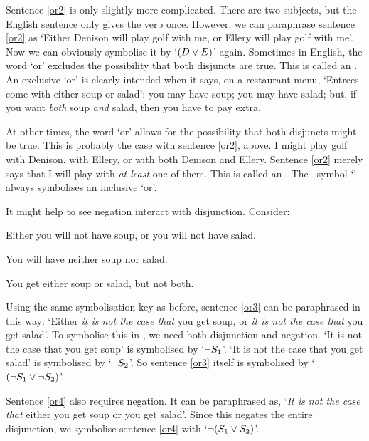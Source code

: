 Sentence \ref{or2} is only slightly more complicated. There are two subjects, but the English sentence only gives the verb once. However, we can paraphrase sentence \ref{or2} as `Either Denison will play golf with me, or Ellery will play golf with me'. Now we can obviously symbolise it by `$(D \vee E)$' again.
Sometimes in English, the word `or' excludes the possibility that both disjuncts are true. This is called an .  An exclusive `or' is clearly intended when it says, on a restaurant menu, `Entrees come with either soup or salad': you may have soup; you may have salad; but, if you want \emph{both} soup \emph{and} salad, then you have to pay extra.

At other times, the word `or' allows for the possibility that both disjuncts might be true. This is probably the case with sentence \ref{or2}, above. I might play golf with Denison, with Ellery, or with both Denison and Ellery. Sentence \ref{or2} merely says that I will play with \emph{at least} one of them. This is called an . The \TFL\ symbol `\eor' always symbolises an inclusive `or'.

It might help to see negation interact with disjunction. Consider:
	\begin{earg}
		\item[\ex{or3}] Either you will not have soup, or you will not have salad.
		\item[\ex{or4}] You will have neither soup nor salad.
		\item[\ex{or.xor}] You get either soup or salad, but not both.
	\end{earg}
Using the same symbolisation key as before, sentence \ref{or3} can be paraphrased in this way: `Either \emph{it is not the case that} you get soup, or \emph{it is not the case that} you get salad'. To symbolise this in \TFL, we need both disjunction and negation. `It is not the case that you get soup' is symbolised by `$\neg S_1$'. `It is not the case that you get salad' is symbolised by `$\neg S_2$'. So sentence \ref{or3} itself is symbolised by `$(\neg S_1 \vee \neg S_2)$'.

Sentence \ref{or4} also requires negation. It can be paraphrased as, `\emph{It is not the case that} either you get soup or you get salad'. Since this negates the entire disjunction, we symbolise sentence \ref{or4} with `$\neg (S_1 \vee S_2)$'.

